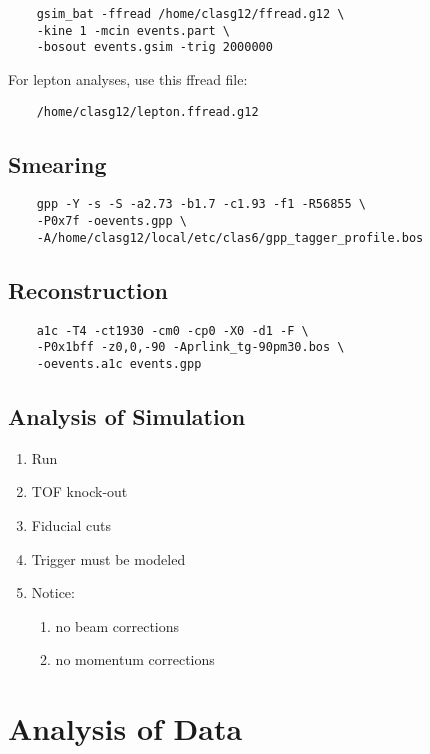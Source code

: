 \documentclass[10pt,twocolumn,oneside,letterpaper]{article}
\begin{document}
\begin{verbatim}
    gsim_bat -ffread /home/clasg12/ffread.g12 \
    -kine 1 -mcin events.part \
    -bosout events.gsim -trig 2000000
\end{verbatim}
For lepton analyses, use this ffread file:
\begin{verbatim}
    /home/clasg12/lepton.ffread.g12
\end{verbatim}

\subsection{Smearing}

\begin{verbatim}
    gpp -Y -s -S -a2.73 -b1.7 -c1.93 -f1 -R56855 \
    -P0x7f -oevents.gpp \
    -A/home/clasg12/local/etc/clas6/gpp_tagger_profile.bos
\end{verbatim}

\subsection{Reconstruction}

\begin{verbatim}
    a1c -T4 -ct1930 -cm0 -cp0 -X0 -d1 -F \
    -P0x1bff -z0,0,-90 -Aprlink_tg-90pm30.bos \
    -oevents.a1c events.gpp
\end{verbatim}

\subsection{Analysis of Simulation}

\begin{enumerate}
    \item Run \prog{eloss}
    \item TOF knock-out
    \item Fiducial cuts
    \item Trigger must be modeled
    \item Notice:
    \begin{enumerate}
        \item no beam corrections
        \item no momentum corrections
    \end{enumerate}
\end{enumerate}

\section{Analysis of Data}
\end{document}
